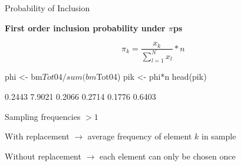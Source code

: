 \documentclass[11pt,german,hideothersubsections]{beamer}
\begin{document}
\begin{frame}[fragile]{Probability of Inclusion}
\footnotesize{
\begin{center}
\textbf{First order inclusion probability under $\pi$ps}
\end{center}
\begin{equation*}
\pi_k=\frac{x_k}{\sum_{l=1}^{N}x_l}*n
\end{equation*}

\begin{Schunk}
\begin{Sinput}
 phi <- bm$Tot04/sum(bm$Tot04)
 pik <- phi*n
 head(pik)
\end{Sinput}
\begin{Soutput}
[1] 0.2443 7.9021 0.2066 0.2714 0.1776 0.6403
\end{Soutput}
\end{Schunk}
\begin{itemize}\footnotesize{
\pause\item[$\Rightarrow$] Sampling frequencies $>1$
\item[$\Rightarrow$] With replacement $\rightarrow$ average frequency of element $k$ in sample
\item[$\Rightarrow$] Without replacement $\rightarrow$ each element can only be chosen once}
\end{itemize}
}
\end{frame}
\end{document}
